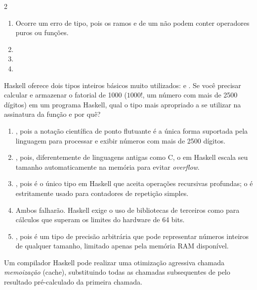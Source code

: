 \documentclass[a4paper,10pt,brazil]{article}
\begin{document}
\begin{multicols}{2}
\begin{enumerate}
  \item Ocorre um erro de tipo, pois os ramos  e  de um  não podem conter operadores puros ou funções.

  \item {}

  \item {}

  \item {}


\end{enumerate}

Haskell oferece dois tipos inteiros básicos muito utilizados:  e . Se você precisar calcular e armazenar o fatorial de 1000 ($1000!$, um número com mais de 2500 dígitos) em um programa Haskell, qual o tipo mais apropriado a se utilizar na assinatura da função e por quê?

\begin{enumerate}
  \item {}, pois a notação científica de ponto flutuante é a única forma suportada pela linguagem para processar e exibir números com mais de 2500 dígitos.

  \item {}, pois, diferentemente de linguagens antigas como C, o  em Haskell escala seu tamanho automaticamente na memória para evitar \emph{overflow}.

  \item {}, pois é o único tipo em Haskell que aceita operações recursivas profundas; o  é estritamente usado para contadores de repetição simples.

  \item Ambos falharão. Haskell exige o uso de bibliotecas de terceiros como  para cálculos que superam os limites do hardware de 64 bits.

  \item {}, pois é um tipo de precisão arbitrária que pode representar números inteiros de qualquer tamanho, limitado apenas pela memória RAM disponível.


\end{enumerate}

Um compilador Haskell pode realizar uma otimização agressiva chamada \emph{memoização} (cache), substituindo todas as chamadas subsequentes de  pelo resultado pré-calculado da primeira chamada. 


\end{multicols}
\end{document}
